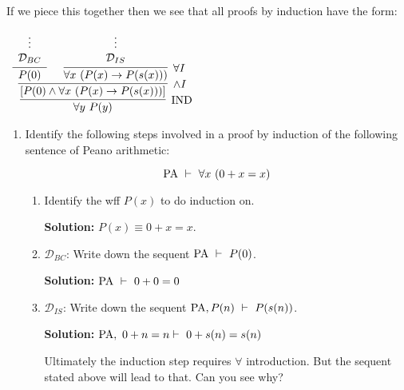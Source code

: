 \documentclass[11pt]{report}
\begin{document}
	If we piece this together then we see that all proofs by induction have the form: 

	\begin{mdframed}
		\begin{center}
			$\begin{array}{c}
				\infer[\IND]{\forall y \ P(y)}
					{\infer[\land I]{[P(0) \land \forall x \ (P(x) \to P(s(x)))]}
						{\infer[]{P(0)}{\begin{array}{c} \vdots \\ \mathcal{D}_{BC}\end{array}}
						&
						\infer[\forall I]{\forall x \ (P(x) \to P(s(x)))}
							{\begin{array}{c} \vdots \\ \mathcal{D}_{IS}\end{array}}}}
			\end{array}$
		\end{center}
	\end{mdframed}

	\begin{enumerate}
		\newpage
		\item Identify the following steps involved in a proof by induction of the following sentence of Peano arithmetic: 
		
		$$\PA \ \vdash \ \forall x \ (0+x=x) $$

			\begin{enumerate}
				\item Identify the wff $P(x)$ to do induction on. 
				
				{\bf Solution:} $P(x) \equiv 0 + x = x$.

				\item $\mathcal{D}_{BC}$: Write down the sequent $\PA \ \vdash \ P(0)$.
				
				{\bf Solution:} $\text{PA} \ \vdash \ 0 + 0 = 0$

				\item $\mathcal{D}_{IS}$: Write down the sequent $\PA, P(n) \ \vdash \ P(s(n))$.	
				
				{\bf Solution:} $\text{PA}, \ 0 + n = n \vdash \ 0 + s(n) = s(n)$

				Ultimately the induction step requires $\forall$ introduction. But the sequent stated above will lead to that. Can you see why? 

			\end{enumerate}
	\end{enumerate}
\end{document}

